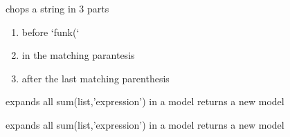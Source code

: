 \documentclass[letterpaper,10pt,english]{sphinxmanual}
\begin{document}

\begin{fulllineitems}
\label{\detokenize{onboard/modelmanipulation:modelmanipulation.find_arg}}
\pysigstartsignatures
{}
\pysigstopsignatures
\sphinxAtStartPar
chops a string in 3 parts
\begin{enumerate}
%
\item {} 
\sphinxAtStartPar
before ‘funk(‘

\item {} 
\sphinxAtStartPar
in the matching parantesis

\item {} 
\sphinxAtStartPar
after the last matching parenthesis

\end{enumerate}

\end{fulllineitems}


\begin{fulllineitems}
\label{\detokenize{onboard/modelmanipulation:modelmanipulation.sumunroll_old}}
\pysigstartsignatures
{}
\pysigstopsignatures
\sphinxAtStartPar
expands all sum(list,’expression’) in a model
returns a new model

\end{fulllineitems}


\begin{fulllineitems}
\label{\detokenize{onboard/modelmanipulation:modelmanipulation.lagarray_unroll}}
\pysigstartsignatures
{}
\pysigstopsignatures
\sphinxAtStartPar
expands all sum(list,’expression’) in a model
returns a new model

\end{fulllineitems}
\end{document}
